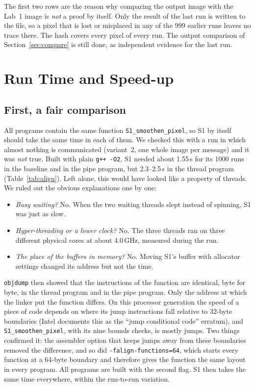\documentclass[11pt,a4paper]{article}
\begin{document}
\noindent The first two rows are the reason why comparing the output image with the Lab~1 image is
\emph{not} a proof by itself. Only the result of the last run is written to the file, so a pixel
that is lost or misplaced in any of the 999 earlier runs leaves no trace there. The hash covers
every pixel of every run. The output comparison of Section~\ref{sec:compare} is still done, as
independent evidence for the last run.

\section{Run Time and Speed-up}
\label{sec:results}

\subsection{First, a fair comparison}
\label{sec:fair}

All programs contain the same function \texttt{S1\_smoothen\_pixel}, so S1 by itself should take the
same time in each of them. We checked this with a run in which almost nothing is communicated
(variant~2, one whole image per message) and it was \emph{not} true. Built with plain
\texttt{g++ -O2}, S1 needed about 1.55\,s for its 1000 runs in the baseline and in the pipe program,
but 2.3--2.5\,s in the thread program (Table~\ref{tab:align}). Left alone, this would have looked
like a property of threads. We ruled out the obvious explanations one by one:
\begin{itemize}\setlength{\itemsep}{1pt}
\item \emph{Busy waiting?} No. When the two waiting threads slept instead of spinning, S1 was just as slow.
\item \emph{Hyper-threading or a lower clock?} No. The three threads ran on three different physical
cores at about 4.0\,GHz, measured during the run.
\item \emph{The place of the buffers in memory?} No. Moving S1's buffer with allocator settings changed
its address but not the time.
\end{itemize}
\texttt{objdump} then showed that the instructions of the function are identical, byte for byte, in
the thread program and in the pipe program. Only the address at which the linker put the function
differs. On this processor generation the speed of a piece of code depends on where its jump
instructions fall relative to 32-byte boundaries (Intel documents this as the ``jump conditional
code'' erratum), and \texttt{S1\_smoothen\_pixel}, with its nine bounds checks, is mostly jumps. Two
things confirmed it: the assembler option that keeps jumps away from these boundaries removed the
difference, and so did \texttt{-falign-functions=64}, which starts every function at a 64-byte
boundary and therefore gives the function the same layout in every program. All programs are built
with the second flag. S1 then takes the same time everywhere, within the run-to-run variation.
\end{document}
